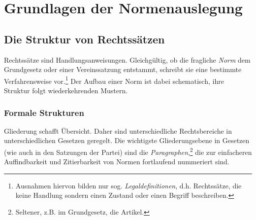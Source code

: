 
\chapter{Grundlagen der Normenauslegung}

\section{Die Struktur von Rechtssätzen}
Rechtssätze sind Handlungsanweisungen. Gleichgültig, ob die fragliche \emph{Norm} dem Grundgesetz oder einer Vereinssatzung entstammt, schreibt sie eine bestimmte Verfahrensweise vor.\footnote{Ausnahmen hiervon bilden nur sog. \emph{Legaldefinitionen}, d.h. Rechtssätze, die keine Handlung sondern einen Zustand oder einen Begriff beschreiben.} Der Aufbau einer Norm ist dabei schematisch, ihre Struktur folgt wiederkehrenden Mustern.

\subsection{Formale Strukturen}
Gliederung schafft Übersicht. Daher sind unterschiedliche Rechtsbereiche in unterschiedlichen Gesetzen geregelt. Die wichtigste Gliederungsebene in Gesetzen (wie auch in den Satzungen der Partei) sind die \emph{Paragraphen},\footnote{Seltener, z.B. im Grundgesetz, die Artikel.} die zur einfacheren Auffindbarkeit und Zitierbarkeit von Normen fortlaufend nummeriert sind.


